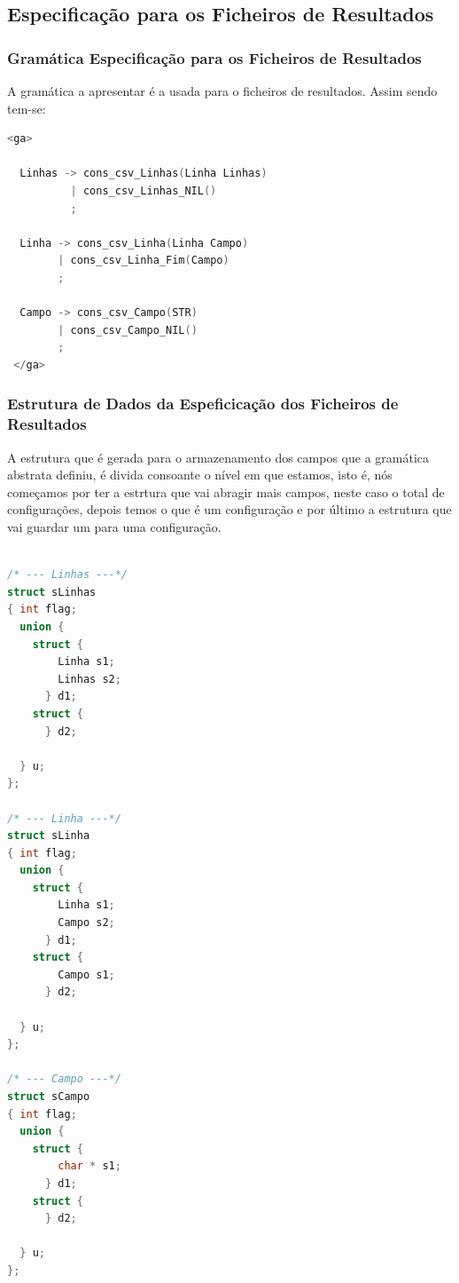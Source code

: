 \documentclass[11pt, a4paper, oneside]{article}
\begin{document}
\subsection{Especificação para os Ficheiros de Resultados}
\subsubsection{Gramática Especificação para os Ficheiros de Resultados}

A gramática a apresentar é a usada para o ficheiros de resultados. Assim sendo tem-se:
\begin{lstlisting}[language=C, caption={Gramática para a linguagem de especificação para os ficheiros de resultados.}]
<ga>
  
  Linhas -> cons_csv_Linhas(Linha Linhas)
          | cons_csv_Linhas_NIL()
          ;

  Linha -> cons_csv_Linha(Linha Campo)
        | cons_csv_Linha_Fim(Campo)
        ;

  Campo -> cons_csv_Campo(STR)
        | cons_csv_Campo_NIL()
        ;
 </ga>
\end{lstlisting}
\newpage
\subsubsection{Estrutura de Dados da Espeficicação dos Ficheiros de Resultados}

A estrutura que é gerada para o armazenamento dos campos que a gramática abstrata definiu, é divida consoante o nível em que estamos, isto é, nós começamos por ter a estrtura que vai abragir mais campos, neste caso o total de configurações, depois temos o que é um configuração e por último a estrutura que vai guardar um para uma configuração.

\begin{lstlisting}[language=C, caption={Estrutura de dados para armazenar a especificação dos ficheiros de resultados.}]

/* --- Linhas ---*/
struct sLinhas 
{ int flag;
  union {  
    struct {
        Linha s1;
        Linhas s2;
      } d1;
    struct {
      } d2;

  } u;
};

/* --- Linha ---*/
struct sLinha 
{ int flag;
  union {  
    struct {
        Linha s1;
        Campo s2;
      } d1;
    struct {
        Campo s1;
      } d2;

  } u;
};

/* --- Campo ---*/
struct sCampo 
{ int flag;
  union {  
    struct {
        char * s1;
      } d1;
    struct {
      } d2;

  } u;
};

\end{lstlisting}
\end{document}
